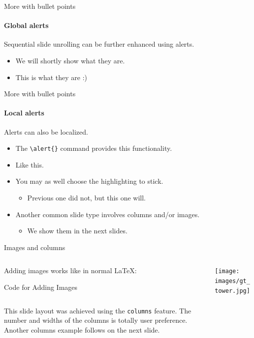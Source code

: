\documentclass{beamer}
\begin{document}
\begin{frame}[fragile]{More with bullet points}
\framesubtitle{Global alerts}
Sequential slide unrolling can be further enhanced using alerts.
\begin{itemize}[<alert@2>]
\item We will shortly show what they are.
\item<2- | alert@2> This is what they are :)
\end{itemize}
\end{frame}


\begin{frame}[fragile]{More with bullet points}
\framesubtitle{Local alerts}
Alerts can also be localized.
\begin{itemize}
\item The \verb|\alert{}| command provides this functionality.
\item Like \alert<2>{this}.
\item You may as well choose the highlighting to stick.
    \begin{itemize}
    \item Previous one did not, but \alert<3->{this one} will.
    \end{itemize}
\item Another common slide type involves columns and/or images.
    \begin{itemize}
    \item We show them in the \alert<4>{next slides}.
    \end{itemize}
\end{itemize}
\end{frame}


\begin{frame}[fragile]{Images and columns}
\begin{columns}
\begin{column}{0.7\textwidth}
Adding images works like in normal \LaTeX:
\begin{block}{Code for Adding Images}
\begin{verbatim}

\end{verbatim}
\end{block}
This slide layout was achieved using the \verb|columns| feature. The number and widths of the columns is totally user preference. Another columns example follows on the next slide.
\end{column}
\begin{column}{0.3\textwidth}
\texttt{[image: images/gt\_tower.jpg]}
\end{column}
\end{columns}
\end{frame}
\end{document}
